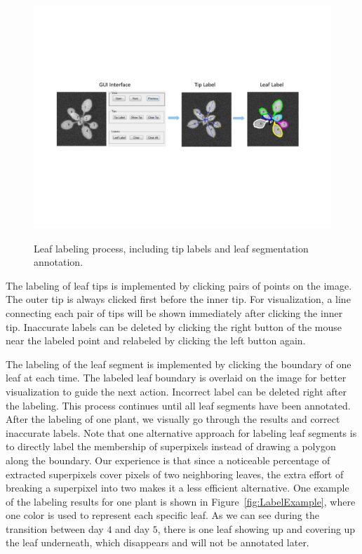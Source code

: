 \begin{figure}
\centering
\includegraphics[width=.98\textwidth]{Figures/labeling}\\
\caption{Leaf labeling process, including tip labels and leaf segmentation annotation.}
\label{fig:label}
\end{figure}

The labeling of leaf tips is implemented by clicking pairs of points on the image.
The outer tip is always clicked first before the inner tip.
For visualization, a line connecting each pair of tips will be shown immediately after clicking the inner tip.
Inaccurate labels can be deleted by clicking the right button of the mouse near the labeled point and relabeled by clicking the left button again.

The labeling of the leaf segment is implemented by clicking the boundary of one leaf at each time.
The labeled leaf boundary is overlaid on the image for better visualization to guide the next action.
Incorrect label can be deleted right after the labeling.
This process continues until all leaf segments have been annotated.
After the labeling of one plant, we visually go through the results and correct inaccurate labels.
Note that one alternative approach for labeling leaf segments is to directly label the membership of superpixels instead of drawing a polygon along the boundary.
Our experience is that since a noticeable percentage of extracted superpixels cover pixels of two neighboring leaves, the extra effort of breaking a superpixel into two makes it a less efficient alternative.
One example of the labeling results for one plant is shown in Figure~\ref{fig:LabelExample}, where one color is used to represent each specific leaf.
As we can see during the transition between day $4$ and day $5$, there is one leaf showing up and covering up the leaf underneath, which disappears and will not be annotated later.


